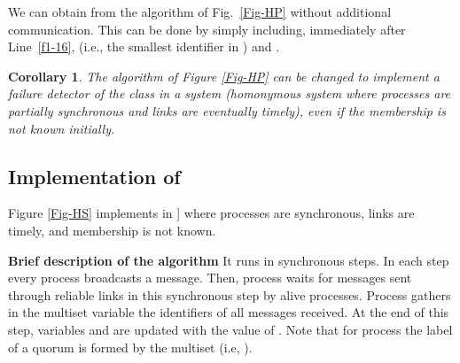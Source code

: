 \documentclass[10pt, conference, compsocconf]{IEEEtran}
\newtheorem{corollary}{Corollary}
\newcommand{\tightparagraph}[1]{\smallskip \noindent \textbf{#1} \hspace{1ex}}
\begin{document}
We can obtain  from the algorithm of Fig.~\ref{Fig-HP} without 
additional communication. This can be done by simply including, 
immediately after Line~\ref{f1-16},   
(i.e., the smallest identifier in ) and .
 
\begin{corollary}
The algorithm of Figure \ref{Fig-HP} can be changed to implement a 
failure detector of the class  in a system  
(homonymous system where processes are partially synchronous and links 
are eventually timely), even if the membership is not known initially.
\end{corollary}





\subsection{Implementation of }
Figure \ref{Fig-HS} implements  in ] 
where processes are synchronous, links are timely, and
membership is not known. 

\tightparagraph{Brief description of the algorithm} 
It runs in synchronous steps. In each step every process  
broadcasts a  message. Then, process  waits for
 messages sent through reliable links 
in this synchronous step by alive processes. Process  
gathers in the multiset variable  the 
identifiers  of all  messages received. 
At the end of this step, variables  and  
are updated with the value of . 
Note that for process  the label  of a quorum  is formed by the 
multiset  (i.e, ).
\end{document}
